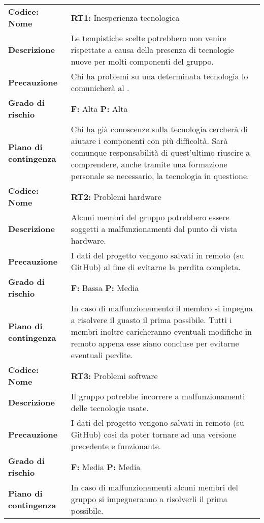 \setcounter{table}{-1}
{


\centering
\renewcommand{\arraystretch}{1.5}
\begin{longtable}{C{3.5cm} | C{11cm}}
\textbf{Codice: Nome} & \textbf{RT1: }{Inesperienza tecnologica}\\
\textbf{Descrizione} & Le tempistiche scelte potrebbero non venire rispettate a causa della presenza di tecnologie nuove per molti componenti del gruppo.\\ 
\textbf{Precauzione} & Chi ha problemi su una determinata tecnologia lo comunicherà al \respProg{}.\\
\textbf{Grado di rischio} & \textbf{F: }  Alta \textbf{P: } Alta\\   
\textbf{Piano di contingenza} & Chi ha già conoscenze sulla tecnologia cercherà di aiutare i componenti con più difficoltà. Sarà comunque responsabilità di quest'ultimo riuscire a comprendere, anche tramite una formazione personale se necessario, la tecnologia in questione.\\
\hline

\textbf{Codice: Nome} & \textbf{RT2: }{Problemi hardware}\\
\textbf{Descrizione} & Alcuni membri del gruppo potrebbero essere soggetti a malfunzionamenti dal punto di vista hardware.\\ 
\textbf{Precauzione} & I dati del progetto vengono salvati in remoto (su GitHub) al fine di evitarne la perdita completa.\\
\textbf{Grado di rischio} & \textbf{F: }Bassa \textbf{P: }Media\\ 
\textbf{Piano di contingenza} & In caso di malfunzionamento il membro si impegna a risolvere il guasto il prima possibile. Tutti i membri inoltre caricheranno eventuali modifiche in remoto appena esse siano concluse per evitarne eventuali perdite.\\
\hline

\textbf{Codice: Nome} & \textbf{RT3: }{Problemi software}\\
\textbf{Descrizione} & Il gruppo potrebbe incorrere a malfunzionamenti delle tecnologie usate.\\ 
\textbf{Precauzione} & I dati del progetto vengono salvati in remoto (su GitHub) così da poter tornare ad una versione precedente e funzionante.\\
\textbf{Grado di rischio} & \textbf{F: }Media \textbf{P: }Media\\ 
\textbf{Piano di contingenza} & In caso di malfunzionamenti alcuni membri del gruppo si impegneranno a risolverli il prima possibile.\\
\hline


\end{longtable}}
